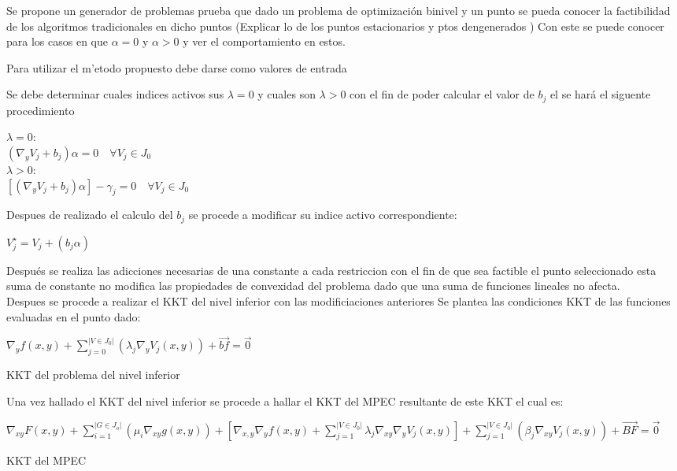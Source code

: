Se propone un generador de problemas prueba que dado un problema de optimización binivel y un punto 
se pueda conocer la factibilidad de los algoritmos tradicionales en dicho puntos (Explicar lo de los puntos estacionarios y ptos dengenerados )
Con este se puede conocer para los casos en que $\alpha=0$ y $\alpha>0$ y ver el comportamiento en estos.


Para utilizar el m'etodo propuesto debe darse como valores de entrada 


Se debe determinar cuales indices activos sus $\lambda = 0$ y cuales son $\lambda>0$ con el fin de poder calcular el valor de $b_j$ el se hará el siguente procedimiento

\begin{table}[H]
	$\lambda =0$:\\
	$(\nabla_{y}V_j+b_j)\alpha=0 \quad \forall V_j \in J_0$ \\
	$\lambda>0$:\\
	$[(\nabla_{y}V_j+b_j)\alpha]-\gamma_j=0 \quad \forall V_j \in J_0$


\end{table}

Despues de realizado el calculo del $b_j$ se procede a modificar su indice activo correspondiente:

\begin{table}[H]
	$V_{j}^{\star}=V_{j}+(b_j\alpha)$
\end{table}

Después se realiza las adicciones necesarias de una constante a cada restriccion con el fin de que sea factible el punto seleccionado
esta suma de constante no modifica las propiedades de convexidad del problema dado que una suma de funciones lineales no afecta.\\


Despues se procede a realizar el KKT del nivel inferior con las modificiaciones anteriores 
Se plantea las condiciones KKT de las funciones evaluadas en el punto dado:
\begin{table}[H]
	$\nabla_{y}f(x,y)+\sum_{j=0}^{|V \in J_0|}(\lambda_j\nabla_{y}V_j(x,y))+\vec{bf}=\vec{0}$
\caption*{KKT del problema del nivel inferior}
\end{table}


Una vez hallado el KKT del nivel inferior se procede a hallar el KKT del MPEC resultante de este KKT el cual es:

\begin{table}[H]
	$\nabla_{xy}F(x,y)+\sum_{i=1}^{|G \in J_o|}(\mu_i\nabla_{xy}g(x,y))+[\nabla_{x,y}\nabla_{y}f(x,y)+\sum_{j=1}^{|V \in J_0|}\lambda_j\nabla_{xy}\nabla_{y}V_j(x,y)]+\sum_{j=1}^{|V \in J_0|}(\beta_j\nabla_{xy}V_j(x,y))+\vec{BF}=\vec{0}$
\caption*{KKT del MPEC}
\end{table}

